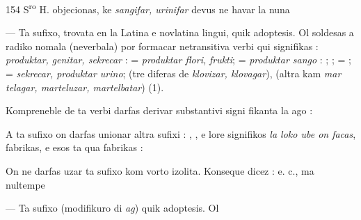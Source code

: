 \begin{VUpage}[158]{154}
{S\textsuperscript{ro} H. objecionas, ke \textit{sangifar, urinifar} devus ne havar la nuna\parplein%
}

 --- Ta sufixo, trovata en la Latina e novlatina lingui,\nl
quik adoptesis. Ol soldesas a radiko nomala (neverbala)\nl
por formacar netransitiva verbi qui signifikas : \textit{produktar,}\nl
\textit{genitar, sekrecar} :  = \textit{produktar flori,}\nl
\textit{frukti};  = \textit{produktar sango} : \nl
{}; ;  = \nl
{};  = \textit{sekrecar, produktar urino}; \nl
{}\nl
(tre diferas de \textit{klovizar, klovagar}),  (altra kam \textit{mar}\cc
\textit{telagar, marteluzar, martelbatar}) (1).

Kompreneble de ta verbi darfas derivar substantivi signi\cc
fikanta la ago : \parplein

A ta sufixo on darfas unionar altra sufixi : , , e\nl
lore  signifikos \textit{la loko ube on facas}, fabrikas, e \nl
esos ta qua fabrikas : \nl
{}

On ne darfas uzar ta sufixo kom vorto izolita. Konseque\nl
dicez :  e. c., ma nultempe \parplein

 --- Ta sufixo (modifikuro di \textit{ag}) quik adoptesis. Ol\parplein
\end{VUpage}

